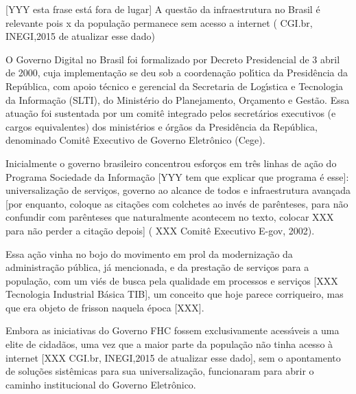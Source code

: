 \documentclass[
12pt,		%
openright,	%
twoside,  %
a4paper,			%
chapter=TITLE,		%
english,			%
french,				%
spanish,			%
brazil				%
]{USPSC-classe/USPSC_RedarTex}
\begin{document}
[YYY esta frase est\'a fora de lugar] A quest\~ao da infraestrutura no Brasil \'e relevante pois x da popula\c{c}\~ao permanece sem acesso a internet ( CGI.br, INEGI,2015 de atualizar esse dado)








O Governo Digital no Brasil foi formalizado por Decreto Presidencial de 3 abril de 2000, cuja implementa\c{c}\~ao se deu sob a coordena\c{c}\~ao pol\'{\i}tica da Presid\^encia da Rep\'ublica, com apoio t\'ecnico e gerencial da Secretaria de Log\'{\i}stica e Tecnologia da Informa\c{c}\~ao (SLTI), do Minist\'erio do Planejamento, Or\c{c}amento e Gest\~ao. Essa atua\c{c}\~ao foi sustentada por um comit\^e integrado pelos secret\'arios executivos (e cargos equivalentes) dos minist\'erios e \'org\~aos da Presid\^encia da Rep\'ublica, denominado Comit\^e Executivo de Governo Eletr\^onico (Cege).








Inicialmente o governo brasileiro concentrou esfor\c{c}os em tr\^es linhas de a\c{c}\~ao do Programa Sociedade da Informa\c{c}\~ao [YYY tem que explicar que programa \'e esse]: universaliza\c{c}\~ao de servi\c{c}os, governo ao alcance de todos e infraestrutura avan\c{c}ada [por enquanto, coloque as cita\c{c}\~oes com colchetes ao inv\'es de par\^enteses, para n\~ao confundir com par\^enteses que naturalmente acontecem no texto, colocar XXX para n\~ao perder a cita\c{c}\~ao depois] ( XXX Comit\^e Executivo E-gov, 2002).








Essa a\c{c}\~ao vinha no bojo do movimento em prol da moderniza\c{c}\~ao da administra\c{c}\~ao p\'ublica, j\'a mencionada, e da presta\c{c}\~ao de servi\c{c}os para a popula\c{c}\~ao, com um vi\'es de busca pela \textquotedbl qualidade em processos e servi\c{c}os [XXX Tecnologia Industrial B\'asica TIB], um conceito que hoje parece corriqueiro, mas que era objeto de frisson naquela \'epoca [XXX].








Embora as iniciativas do Governo FHC fossem exclusivamente acess\'{\i}veis a uma elite de cidad\~aos, uma vez que a maior parte da popula\c{c}\~ao n\~ao tinha acesso \`a internet [XXX CGI.br, INEGI,2015 de atualizar esse dado], sem o apontamento de solu\c{c}\~oes sist\^emicas para sua universaliza\c{c}\~ao, funcionaram para abrir o caminho institucional do Governo Eletr\^onico.
\end{document}
